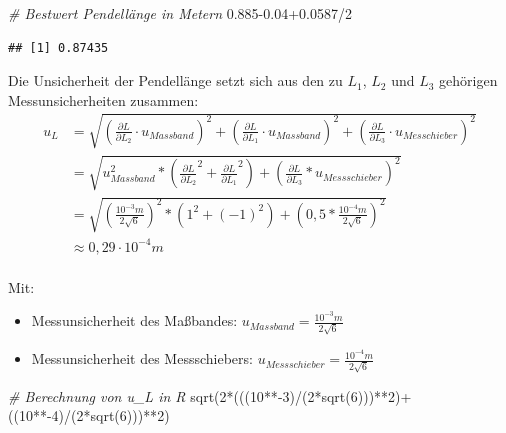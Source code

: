 \documentclass[
  9pt,
]{article}
\newenvironment{Shaded}{\begin{snugshade}}{\end{snugshade}}
\newcommand{\CommentTok}[1]{\textcolor[rgb]{0.56,0.35,0.01}{\textit{#1}}}
\newcommand{\DecValTok}[1]{\textcolor[rgb]{0.00,0.00,0.81}{#1}}
\newcommand{\FloatTok}[1]{\textcolor[rgb]{0.00,0.00,0.81}{#1}}
\newcommand{\FunctionTok}[1]{\textcolor[rgb]{0.00,0.00,0.00}{#1}}
\newcommand{\NormalTok}[1]{#1}
\newcommand{\SpecialCharTok}[1]{\textcolor[rgb]{0.00,0.00,0.00}{#1}}
\begin{document}
\begin{Shaded}
\begin{Highlighting}[]
\CommentTok{\# Bestwert Pendellänge in Metern}
\FloatTok{0.885{-}0.04+0.0587}\SpecialCharTok{/}\DecValTok{2}
\end{Highlighting}
\end{Shaded}

\begin{verbatim}
## [1] 0.87435
\end{verbatim}

Die Unsicherheit der Pendellänge setzt sich aus den zu \(L_1\), \(L_2\)
und \(L_3\) gehörigen Messunsicherheiten zusammen:
\begin{equation}\label{Pendel:U_L}
\begin{split}
u_L&= \sqrt{(\frac{\partial L}{\partial L_2} \cdot u_{Massband})^2+(\frac{\partial L}{\partial L_1} \cdot u_{Massband})^2+(\frac{\partial L}{\partial L_{3}} \cdot u_{Messchieber})^2}\\
&= \sqrt{u_{Massband}^2*(\frac{\partial L}{\partial L_2}^2+\frac{\partial L}{\partial L_1}^2)+(\frac{\partial L}{\partial L_{3}}*u_{Messschieber})^2}\\
&=\sqrt{(\frac{10^{-3}m}{2\sqrt{6}})^2*(1^2+(-1)^2)+(0,5*\frac{10^{-4}m}{2\sqrt{6}})^2}\\
&\approx 0,29 \cdot 10^{-4}m\\
\end{split}
\end{equation}

Mit:

\begin{itemize}
  \item Messunsicherheit des Maßbandes: $u_{Massband}=\frac{10^{-3}m}{2\sqrt{6}}$
  \item Messunsicherheit des Messschiebers: $u_{Messschieber}=\frac{10^{-4}m}{2\sqrt{6}}$
\end{itemize}

\begin{Shaded}
\begin{Highlighting}[]
\CommentTok{\# Berechnung von u\_L in R}
\FunctionTok{sqrt}\NormalTok{(}\DecValTok{2}\SpecialCharTok{*}\NormalTok{(((}\DecValTok{10}\SpecialCharTok{**{-}}\DecValTok{3}\NormalTok{)}\SpecialCharTok{/}\NormalTok{(}\DecValTok{2}\SpecialCharTok{*}\FunctionTok{sqrt}\NormalTok{(}\DecValTok{6}\NormalTok{)))}\SpecialCharTok{**}\DecValTok{2}\NormalTok{)}\SpecialCharTok{+}\NormalTok{((}\DecValTok{10}\SpecialCharTok{**{-}}\DecValTok{4}\NormalTok{)}\SpecialCharTok{/}\NormalTok{(}\DecValTok{2}\SpecialCharTok{*}\FunctionTok{sqrt}\NormalTok{(}\DecValTok{6}\NormalTok{)))}\SpecialCharTok{**}\DecValTok{2}\NormalTok{)}
\end{Highlighting}
\end{Shaded}
\end{document}
